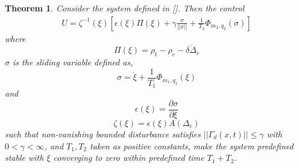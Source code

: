 \documentclass[]{article}
\newtheorem{theorem}{Theorem}
\theoremstyle{remark}
\theoremstyle{definition}
\begin{document}
\begin{theorem}
Consider the system defined in []. Then the control 
\begin{align}
	U = \zeta^{-1}(\xi)\left[\epsilon(\xi)\Pi(\xi)+ \gamma \frac{\sigma}{||\sigma||} + \frac{1}{T_2}\Phi_{m_2,q_2}(\sigma)\right]
\end{align} 
where \[\Pi(\xi) = \rho_t-\rho_c-\delta\dot\Delta_r\]
$\sigma$ is the sliding variable defined as,
\[\sigma  = \dot{\xi} + \frac{1}{T_1}\Phi_{m_1,q_1}(\xi)\]
and \[\epsilon(\xi)= \frac{\partial \sigma}{\partial \xi}\]
\[\zeta(\xi) = \epsilon(\xi)A(\Delta_c)\]
such that non-vanishing bounded disturbance satisfies $||\Gamma_d(x,t)||\leq \gamma$ with $ 0< \gamma < \infty$, and $ T_1, T_2 $ taken as positive constants, make the system predefined stable with $\xi$ converging to zero within predefined time $T_1+T_2$.
\end{theorem}
\end{document}

